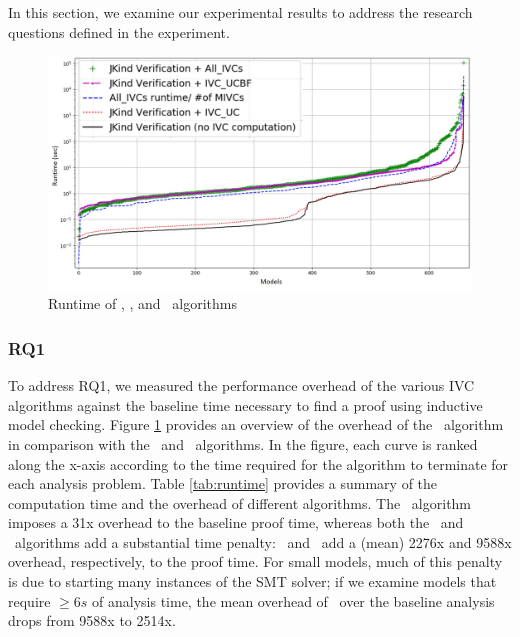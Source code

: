 \label{sec:results}

In this section, we examine our
experimental results to address the research questions defined in the experiment.

\begin{figure}
 \centering
  \includegraphics[width=\columnwidth]{figs/performance.jpg}
  \vspace{-0.1in}
  \caption{Runtime of \aivcalg, \ucbfalg, and \ucalg ~algorithms}
  \label{fig:performance}
\end{figure}


\subsubsection{RQ1}

To address RQ1, we measured the performance overhead of the various IVC algorithms against the baseline time
necessary to find a proof using inductive model checking. Figure \ref{fig:performance} provides an overview of the  overhead of the \aivcalg ~algorithm in comparison with the \ucalg ~and \ucbfalg\ algorithms.  In the figure, each curve is ranked along the x-axis according to the time required for the algorithm to terminate for each analysis problem.
Table \ref{tab:runtime} provides a summary of the computation time and the overhead of different algorithms.  The \ucalg\ algorithm imposes a  31x overhead to the baseline proof time, whereas both the \ucbfalg\ and \aivcalg\ algorithms add a substantial time penalty: \ucbfalg\ and \aivcalg\ add a (mean) 2276x and 9588x overhead, respectively, to the proof time.
For small models, much of this penalty is due to starting many instances of the SMT solver; if we examine models that require $\geq6s$ of analysis time, the mean overhead of \aivcalg\ over the baseline analysis drops from 9588x to 2514x.

